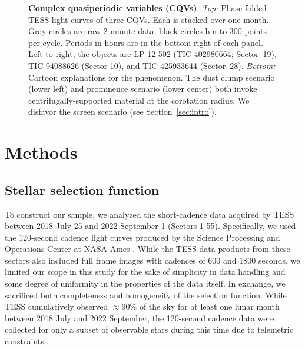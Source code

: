\documentclass[11pt,twocolumn,tighten]{aastex63}
\begin{document}
\begin{figure*}[!t]
	\begin{center}
		
		\vspace{-0.6cm}
	\end{center}
		\vspace{-0.3cm}
	\caption{
		{\bf Complex quasiperiodic variables (CQVs)}:
    {\it Top:} Phase-folded TESS light curves of three CQVs.  Each is
    stacked over one month.  Gray circles are raw 2-minute data; black
    circles bin to 300 points per cycle.  Periods in hours are in the
    bottom right of each panel.  Left-to-right, the objects are LP
    12-502 (TIC 402980664; Sector~19), TIC 94088626 (Sector 10), and
    TIC 425933644 (Sector~28).
    {\it Bottom:} Cartoon explanations for the phenomenon.  The dust clump
    scenario (lower left) and prominence scenario (lower center) both
    invoke centrifugally-supported material at the corotation radius.
    We disfavor the screen scenario (see Section~\ref{sec:intro}).
	}
	\label{fig:f1}
\end{figure*}



\section{Methods}
\label{sec:methods}

\subsection{Stellar selection function}
\label{subsec:selectionfn}

To construct our sample, we analyzed the short-cadence data acquired
by TESS between 2018 July 25 and 2022 September 1 (Sectors 1-55).
Specifically, we used the 120-second cadence light curves produced by
the Science Processing and Operations Center at NASA Ames
\citep{2016SPIE.9913E..3EJ}.  While the TESS data products from these
sectors also included full frame images with cadences of 600 and 1800
seconds, we limited our scope in this study for the sake of simplicity
in data handling and some degree of uniformity in the properties of
the data itself.  In exchange, we sacrificed both completeness and
homogeneity of the selection function.  While TESS cumulatively
observed $\approx$90\% of the sky for at least one lunar month between
2018 July and 2022 September, the 120-second cadence data were
collected for only a subset of observable stars during this time due
to telemetric constraints \citep[see][]{2021PASP..133i5002F}.
\end{document}
